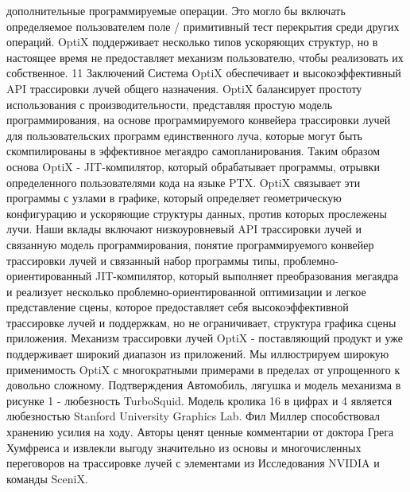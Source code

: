 дополнительные программируемые операции. Это могло бы включать определяемое пользователем поле / примитивный тест перекрытия среди других операций. OptiX поддерживает несколько типов ускоряющих структур, но в настоящее время не предоставляет механизм пользователю, чтобы реализовать их собственное.
11 Заключений
Система OptiX обеспечивает и высокоэффективный API трассировки лучей общего назначения. OptiX балансирует простоту использования с производительности, представляя простую модель программирования, на основе программируемого конвейера трассировки лучей для пользовательских программ единственного луча, которые могут быть скомпилированы в эффективное мегаядро самопланирования. Таким образом основа OptiX - JIT-компилятор, который обрабатывает программы,
отрывки определенного пользователями кода на языке PTX. OptiX связывает эти программы с узлами в графике, который определяет геометрическую конфигурацию и ускоряющие структуры данных, против которых прослежены лучи. Наши вклады включают низкоуровневый API трассировки лучей и связанную модель программирования, понятие программируемого
конвейер трассировки лучей и связанный набор программы
типы, проблемно-ориентированный JIT-компилятор, который выполняет преобразования мегаядра и реализует несколько проблемно-ориентированной оптимизации и легкое представление сцены, которое предоставляет себя высокоэффективной трассировке лучей и поддержкам, но не ограничивает, структура графика сцены приложения. Механизм трассировки лучей OptiX - поставляющий продукт и уже поддерживает широкий диапазон
из приложений. Мы иллюстрируем широкую применимость OptiX с многократными примерами в пределах от упрощенного к довольно сложному. 
Подтверждения
Автомобиль, лягушка и модель механизма в рисунке 1 - любезность TurboSquid. Модель кролика 16 в цифрах и 4 является любезностью Stanford University Graphics Lab. Фил Миллер способствовал хранению усилия на ходу. Авторы ценят ценные комментарии от доктора Грега Хумфреиса и извлекли выгоду значительно из основы и многочисленных переговоров на трассировке лучей с элементами
из Исследования NVIDIA и команды SceniX.
